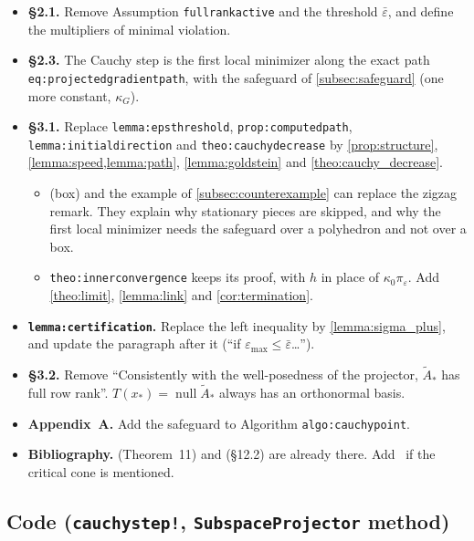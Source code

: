 \documentclass[11pt,a4paper]{article}
\numberwithin{equation}{section}
\theoremstyle{plain}
\theoremstyle{definition}
\theoremstyle{remark}
\newcommand{\kG}{\kappa_G}
\newcommand{\codeus}{\textunderscore\allowbreak}
\newcommand{\code}[1]{{\let\_\codeus\texttt{#1}}}
\begin{document}
\begin{itemize}
\item \textbf{§2.1.} Remove Assumption \code{full\_rank\_active} and the threshold
  $\bar\varepsilon$, and define the multipliers of minimal violation.
\item \textbf{§2.3.} The Cauchy step is the first local minimizer along the exact path
  \code{eq:\allowbreak projected\_gradient\_path}, with the safeguard of \cref{subsec:safeguard} (one more
  constant, $\kG$).
\item \textbf{§3.1.} Replace \code{lemma:\allowbreak eps\_threshold}, \code{prop:\allowbreak computed\_path},
  \code{lemma:\allowbreak initial\_direction} and \code{theo:\allowbreak cauchy\_decrease} by
  \cref{prop:structure}, \cref{lemma:speed,lemma:path}, \cref{lemma:goldstein} and
  \cref{theo:cauchy_decrease}.
  \begin{itemize}
  \item {} (box) and the example of \cref{subsec:counterexample} can replace the
    zigzag remark. They explain why stationary pieces are skipped, and why the first local
    minimizer needs the safeguard over a polyhedron and not over a box.
  \item \code{theo:\allowbreak inner\_convergence} keeps its proof, with $h$ in place of
    $\kappa_0\pi_\varepsilon$. Add \cref{theo:limit}, \cref{lemma:link} and
    \cref{cor:termination}.
  \end{itemize}
\item \textbf{\code{lemma:\allowbreak certification}.} Replace the left inequality by
  \cref{lemma:sigma_plus}, and update the paragraph after it (``if
  $\varepsilon_{\max}\le\bar\varepsilon$\ldots'').
\item \textbf{§3.2.} Remove ``Consistently with the well-posedness of the projector,
  $\tilde A_*$ has full row rank''. $T(x_*)=\operatorname{null}\tilde A_*$ always has an
  orthonormal basis.
\item \textbf{Appendix~A.} Add the safeguard to Algorithm \code{algo:\allowbreak cauchy\_point}.
\item \textbf{Bibliography.} \cite{CGT88} (Theorem~11) and \cite{CGT00} (§12.2) are already
  there. Add~\cite{Har77} if the critical cone is mentioned.
\end{itemize}

\subsection{Code (\texorpdfstring{\code{cauchy\_step!}, \code{SubspaceProjector}}{cauchy\_step!, SubspaceProjector} method)}\label{subsec:code}
\end{document}
